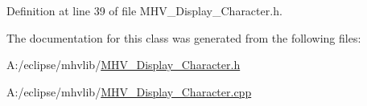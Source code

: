 \-Definition at line 39 of file \-M\-H\-V\-\_\-\-Display\-\_\-\-Character.\-h.



\-The documentation for this class was generated from the following files\-:\begin{DoxyCompactItemize}
\item 
\-A\-:/eclipse/mhvlib/\hyperlink{_m_h_v___display___character_8h}{\-M\-H\-V\-\_\-\-Display\-\_\-\-Character.\-h}\item 
\-A\-:/eclipse/mhvlib/\hyperlink{_m_h_v___display___character_8cpp}{\-M\-H\-V\-\_\-\-Display\-\_\-\-Character.\-cpp}\end{DoxyCompactItemize}
